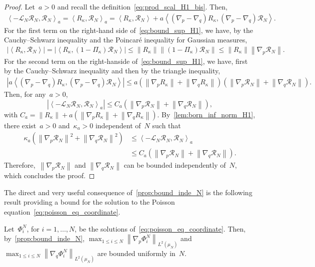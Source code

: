 \documentclass[onefignum,onetabnum]{siamart251216} %
\newcommand{\norm}[1]{\left\lVert#1\right\rVert}
\newcommand{\mc}[1]{\mathcal{#1}}
\renewcommand{\leq}{\leqslant}
\newcommand{\mescin}{\mu}
\newcommand{\projvit}{\Pi_{\kappa}}
\newcommand{\slangle}[1]{\left\langle #1 \right\rangle}
\theoremstyle{plain}
\numberwithin{equation}{section}
\numberwithin{theorem}{section}
\begin{document}
\begin{proof}
    Let~$a>0$ and recall the definition~\eqref{eq:prod_scal_H1_bis}. Then,
    \begin{align}
        \label{eq:bound_sup_H1}
    \slangle{-\mc{L}_N \mc{R}_N,\mc{R}_N}_a = \slangle{R_\kappa,\mc{R}_N}_a = \slangle{R_\kappa,\mc{R}_N} + a\slangle{(\nabla_p - \nabla_q) R_\kappa,(\nabla_p - \nabla_q)\mc{R}_N}.
    \end{align}
    For the first term on the right-hand side of~\eqref{eq:bound_sup_H1}, we have, by the Cauchy--Schwarz inequality and the Poincaré inequality for Gaussian measures,
    \begin{align*}
    \left|\slangle{R_\kappa,\mc{R}_N}\right| = \left|\slangle{R_\kappa,(1-\projvit)\mc{R}_N}\right|
     \leq \norm{R_\kappa}\norm{(1-\projvit)\mc{R}_N} \leq \norm{R_\kappa}\norm{\nabla_p \mc{R}_N}.
    \end{align*}
    For the second term on the right-hanside of~\eqref{eq:bound_sup_H1}, we have, first by the Cauchy--Schwarz inequality and then by the triangle inequality,
    \begin{align*}
    \left|a\slangle{(\nabla_p - \nabla_q) R_\kappa,(\nabla_p - \nabla_q)\mc{R}_N}\right| \leq a(\norm{\nabla_p R_\kappa}+\norm{\nabla_q R_\kappa})(\norm{\nabla_p \mc{R}_N} + \norm{\nabla_q \mc{R}_N}).
    \end{align*}
    Then, for any~$a>0$,
    \[
    \left|\slangle{-\mc{L}_N \mc{R}_N,\mc{R}_N}_a\right| \leq C_a(\norm{\nabla_p \mc{R}_N} + \norm{\nabla_q \mc{R}_N}),
    \]
    with $C_a = \norm{R_\kappa} + a(\norm{\nabla_p R_\kappa}+\norm{\nabla_q R_\kappa})$.
    By~\cref{lem:born_inf_norm_H1}, there exist~$a>0$ and~$\kappa_a >0$ independent of~$N$ such that
    \begin{align*}
    \kappa_a(\norm{\nabla_p \mc{R}_N}^2 + \norm{\nabla_q \mc{R}_N}^2)
     & \leq \slangle{-\mc{L}_N \mc{R}_N,\mc{R}_N}_a \\
     & \leq C_a(\norm{\nabla_p \mc{R}_N} + \norm{\nabla_q \mc{R}_N}).
    \end{align*}
    Therefore,~$\norm{\nabla_p \mc{R}_N}$ and $\norm{\nabla_q \mc{R}_N}$ can be bounded independently of~$N$, which concludes the proof.
\end{proof}
The direct and very useful consequence of~\cref{prop:bound_inde_N} is the following result providing a bound for the solution to the Poisson equation~\eqref{eq:poisson_eq_coordinate}.
\begin{corollary}
    \label{cor:bound_unif_grad_poisson}
    Let~$\Phi_i^N$, for $i=1,\dotsc, N$, be the solutions of~\eqref{eq:poisson_eq_coordinate}. Then, by~\cref{prop:bound_inde_N},  $\displaystyle\max_{1\leq i \leq N}\norm{\nabla_p \Phi_i^N}_{L^2(\mescin_N)}$ and~$\displaystyle\max_{1\leq i \leq N}\norm{\nabla_q \Phi_i^N}_{L^2(\mescin_N)}$ are bounded uniformly in~$N$.
\end{corollary}
\end{document}
